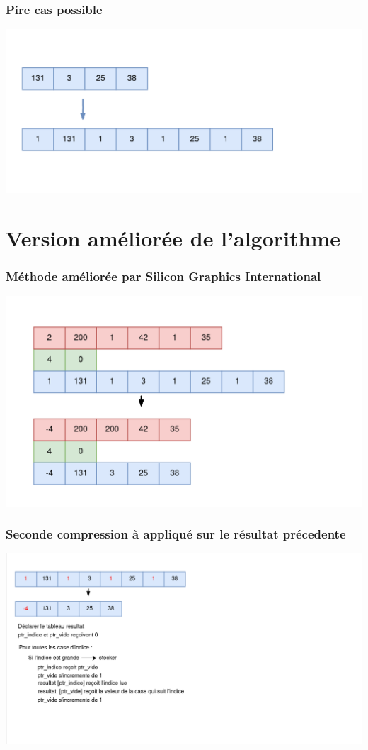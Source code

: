 \documentclass{beamer}
\begin{document}
    \begin{frame}
        \frametitle{Pire cas possible}
        \includegraphics[width=\linewidth]{img/fig4.png}
    \end{frame}

    \section{Version améliorée de l'algorithme}
    \begin{frame}
        \frametitle{Méthode améliorée par Silicon Graphics International}
        \includegraphics[width=\linewidth]{img/fig5.png}
    \end{frame}   
    
    \begin{frame}
        \frametitle{Seconde compression à appliqué sur le résultat précedente}
        \includegraphics[width=\linewidth]{img/fig7.png}
    \end{frame}   
    
\end{document}

